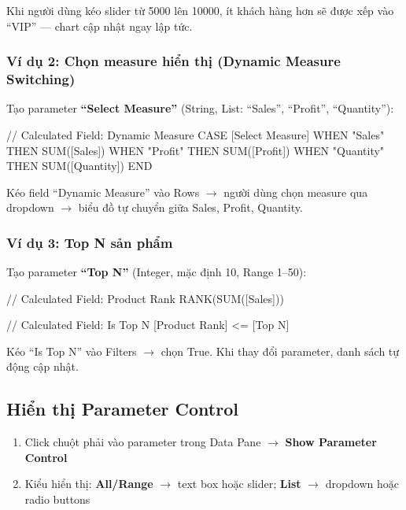 \documentclass[12pt]{article}
\begin{document}
\noindent Khi người dùng kéo slider từ 5000 lên 10000, ít khách hàng hơn sẽ được xếp vào ``VIP'' --- chart cập nhật ngay lập tức.

\subsubsection{Ví dụ 2: Chọn measure hiển thị (Dynamic Measure Switching)}

\noindent Tạo parameter \textbf{``Select Measure''} (String, List: ``Sales'', ``Profit'', ``Quantity''):

\begin{aivncodebox}[]
\begin{python}
// Calculated Field: Dynamic Measure
CASE [Select Measure]
WHEN "Sales" THEN SUM([Sales])
WHEN "Profit" THEN SUM([Profit])
WHEN "Quantity" THEN SUM([Quantity])
END
\end{python}
\end{aivncodebox}

\noindent Kéo field ``Dynamic Measure'' vào Rows $\rightarrow$ người dùng chọn measure qua dropdown $\rightarrow$ biểu đồ tự chuyển giữa Sales, Profit, Quantity.

\subsubsection{Ví dụ 3: Top N sản phẩm}

\noindent Tạo parameter \textbf{``Top N''} (Integer, mặc định 10, Range 1--50):

\begin{aivncodebox}[]
\begin{python}
// Calculated Field: Product Rank
RANK(SUM([Sales]))

// Calculated Field: Is Top N
[Product Rank] <= [Top N]
\end{python}
\end{aivncodebox}

\noindent Kéo ``Is Top N'' vào Filters $\rightarrow$ chọn True. Khi thay đổi parameter, danh sách tự động cập nhật.

\subsection{Hiển thị Parameter Control}

\begin{enumerate}[nosep]
    \item Click chuột phải vào parameter trong Data Pane $\rightarrow$ \textbf{Show Parameter Control}
    \item Kiểu hiển thị: \textbf{All/Range} $\rightarrow$ text box hoặc slider; \textbf{List} $\rightarrow$ dropdown hoặc radio buttons
\end{enumerate}
\end{document}
